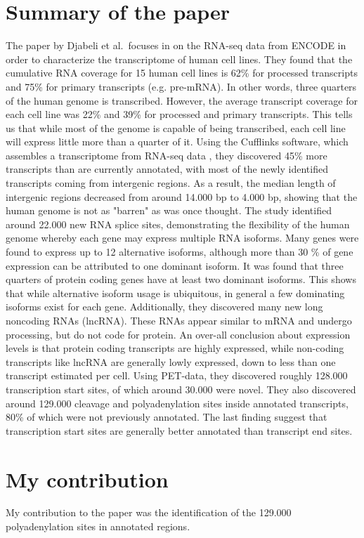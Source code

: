 \section{Summary of the paper}
The paper by Djabeli et al.\ focuses in on the RNA-seq data from ENCODE in
order to characterize the transcriptome of human cell lines. They found that
the cumulative RNA coverage for 15 human cell lines is 62\% for processed
transcripts and 75\% for primary transcripts (e.g. pre-mRNA). In other words,
three quarters of the human genome is transcribed. However, the average
transcript coverage for each cell line was 22\% and 39\% for processed and
primary transcripts. This tells us that while most of the genome is capable of
being transcribed, each cell line will express little more than a quarter of
it. Using the Cufflinks software, which assembles a transcriptome from RNA-seq
data \cite{trapnell_transcript_2010}, they discovered 45\% more transcripts
than are currently annotated, with most of the newly identified transcripts
coming from intergenic regions. As a result, the median length of intergenic
regions decreased from around 14.000 bp to 4.000 bp, showing that the human
genome is not as "barren" as was once thought. The study identified around
22.000 new RNA splice sites, demonstrating the flexibility of the human genome
whereby each gene may express multiple RNA isoforms. Many genes were found to
express up to 12 alternative isoforms, although more than 30 \% of gene
expression can be attributed to one dominant isoform. It was found that three
quarters of protein coding genes have at least two dominant isoforms. This
shows that while alternative isoform usage is ubiquitous, in general a few
dominating isoforms exist for each gene. Additionally, they discovered many new
long noncoding RNAs (lncRNA). These RNAs appear similar to mRNA and undergo
processing, but do not code for protein. An over-all conclusion about
expression levels is that protein coding transcripts are highly expressed,
while non-coding transcripts like lncRNA are generally lowly expressed, down to
less than one transcript estimated per cell. Using PET-data, they discovered
roughly 128.000 transcription start sites, of which around 30.000 were novel.
They also discovered around 129.000 cleavage and polyadenylation sites inside
annotated transcripts, 80\% of which were not previously annotated. The last
finding suggest that transcription start sites are generally better annotated
than transcript end sites.

\section{My contribution}
My contribution to the paper was the identification of the 129.000
polyadenylation sites in annotated regions.

